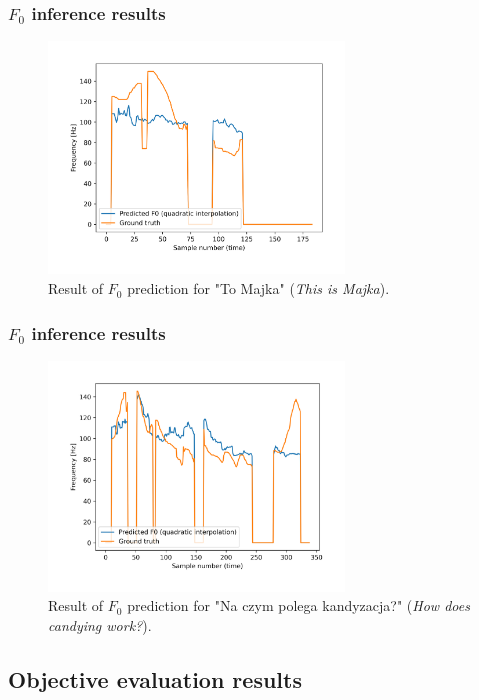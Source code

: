 \documentclass[a4paper,9pt]{beamer}
\theoremstyle{mytheoremstyle}
\begin{document}
\begin{frame}
\frametitle{$F_{0}$ inference results}
\begin{figure}
\begin{center}
  \includegraphics[width=0.7\textwidth]{res/amu_pl_ilo_BAZA_2006D_D1140_simple_pred_freq}
\end{center}
	\caption{Result of $F_0$ prediction for "To Majka" (\textit{This is Majka}).}
\end{figure}
\end{frame}

\begin{frame}
\frametitle{$F_{0}$ inference results}
\begin{figure}
\begin{center}
  \includegraphics[width=0.7\textwidth]{res/amu_pl_ilo_BAZA_2006C_C0208_simple_pred_freq}
\end{center}
	\caption{Result of $F_0$ prediction for "Na czym polega kandyzacja?" (\textit{How does candying work?}).}
\end{figure}
\end{frame}

\subsection{Objective evaluation results}
\end{document}
